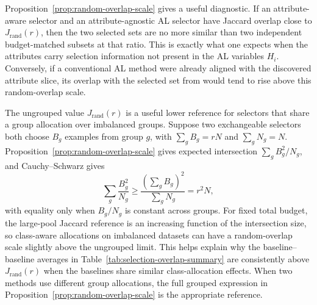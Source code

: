 Proposition~\ref{prop:random-overlap-scale} gives a useful diagnostic. If an attribute-aware selector and an attribute-agnostic AL selector have Jaccard overlap close to $J_{\mathrm{rand}}(r)$, then the two selected sets are no more similar than two independent budget-matched subsets at that ratio. This is exactly what one expects when the attributes carry selection information not present in the AL variables $H_i$. Conversely, if a conventional AL method were already aligned with the discovered attribute slice, its overlap with the selected set from \model would tend to rise above this random-overlap scale.

The ungrouped value $J_{\mathrm{rand}}(r)$ is a useful lower reference for selectors that share a group allocation over imbalanced groups. Suppose two exchangeable selectors both choose $B_g$ examples from group $g$, with $\sum_g B_g=rN$ and $\sum_g N_g=N$. Proposition~\ref{prop:random-overlap-scale} gives expected intersection $\sum_g B_g^2/N_g$, and Cauchy--Schwarz gives
\begin{equation}
\sum_g \frac{B_g^2}{N_g}
\geq
\frac{\left(\sum_g B_g\right)^2}{\sum_g N_g}
=
r^2N,
\end{equation}
with equality only when $B_g/N_g$ is constant across groups. For fixed total budget, the large-pool Jaccard reference is an increasing function of the intersection size, so class-aware allocations on imbalanced datasets can have a random-overlap scale slightly above the ungrouped limit. This helps explain why the baseline--baseline averages in Table~\ref{tab:selection-overlap-summary} are consistently above $J_{\mathrm{rand}}(r)$ when the baselines share similar class-allocation effects. When two methods use different group allocations, the full grouped expression in Proposition~\ref{prop:random-overlap-scale} is the appropriate reference.

